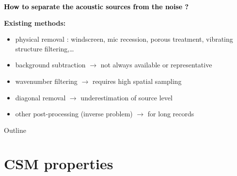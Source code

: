 \documentclass[10pt,xcolor=x11names,compress, show notes]{beamer}%
\begin{document}
\begin{frame}[t]{\insertsectionhead}
	\begin{center}
		\textcolor{black}{\bfseries \centering  How to separate the acoustic sources from the noise ?}
	\end{center}
	\vfill
{ \bfseries Existing methods:}
\small
	\begin{itemize}
        		\item physical removal : windscreen, mic recession, porous treatment, vibrating structure filtering,\dots
        		\item background subtraction $\rightarrow$ not always available or representative
        		\item wavenumber filtering $\rightarrow$ requires high spatial sampling
        		\item diagonal removal $\rightarrow$ underestimation of source level
        		\item other post-processing (inverse problem) $\rightarrow$ for long records
	\end{itemize}

	\vfill
{}
\end{frame}

\begin{frame}{Outline}
	\tableofcontents[]
\end{frame}

\section{CSM properties}
\end{document}
